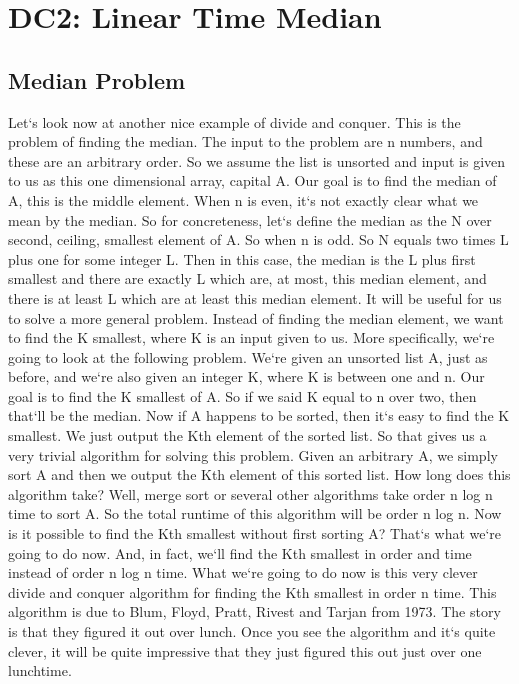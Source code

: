 \section{DC2: Linear Time Median}

\subsection{Median Problem}
Let`s look now at another nice example of divide and conquer.
This is the problem of finding the median.
The input to the problem are n numbers, and these are an arbitrary order.
So we assume the list is unsorted and input is given to us as this one dimensional array, capital A\@.
Our goal is to find the median of A, this is the middle element.
When n is even, it`s not exactly clear what we mean by the median.
So for concreteness, let`s define the median as the N over second, ceiling, smallest element of A\@.
So when n is odd.
So N equals two times L plus one for some integer L\@.
Then in this case, the median is the L plus first smallest and there are exactly L which are, at most, this median element, and there is at least L which are at least this median element.
It will be useful for us to solve a more general problem.
Instead of finding the median element, we want to find the K smallest, where K is an input given to us.
More specifically, we`re going to look at the following problem.
We`re given an unsorted list A, just as before, and we`re also given an integer K, where K is between one and n.
Our goal is to find the K smallest of A\@.
So if we said K equal to n over two, then that`ll be the median.
Now if A happens to be sorted, then it`s easy to find the K smallest.
We just output the Kth element of the sorted list.
So that gives us a very trivial algorithm for solving this problem.
Given an arbitrary A, we simply sort A and then we output the Kth element of this sorted list.
How long does this algorithm take? Well, merge sort or several other algorithms take order n log n time to sort A\@.
So the total runtime of this algorithm will be order n log n.
Now is it possible to find the Kth smallest without first sorting A? That`s what we`re going to do now.
And, in fact, we`ll find the Kth smallest in order and time instead of order n log n time.
What we`re going to do now is this very clever divide and conquer algorithm for finding the Kth smallest in order n time.
This algorithm is due to Blum, Floyd, Pratt, Rivest and Tarjan from 1973.
The story is that they figured it out over lunch.
Once you see the algorithm and it`s quite clever, it will be quite impressive that they just figured this out just over one lunchtime.

